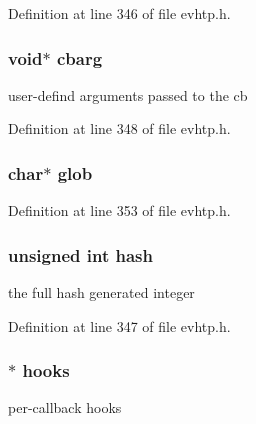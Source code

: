 Definition at line 346 of file evhtp.\-h.

\hypertarget{structevhtp__callback__s_aafd3d1a6343925cb274875556a6faa0e}{
\subsubsection[{cbarg}]{\setlength{\rightskip}{0pt plus 5cm}void$\ast$ cbarg}}\label{structevhtp__callback__s_aafd3d1a6343925cb274875556a6faa0e}
user-\/defind arguments passed to the cb 

Definition at line 348 of file evhtp.\-h.

\hypertarget{structevhtp__callback__s_ac921642f435071137acef3e073973b99}{
\subsubsection[{glob}]{\setlength{\rightskip}{0pt plus 5cm}char$\ast$ glob}}\label{structevhtp__callback__s_ac921642f435071137acef3e073973b99}


Definition at line 353 of file evhtp.\-h.

\hypertarget{structevhtp__callback__s_a09f9a9ce240560b1d191b42ed56af642}{
\subsubsection[{hash}]{\setlength{\rightskip}{0pt plus 5cm}unsigned int hash}}\label{structevhtp__callback__s_a09f9a9ce240560b1d191b42ed56af642}
the full hash generated integer 

Definition at line 347 of file evhtp.\-h.

\hypertarget{structevhtp__callback__s_ac97663394f74c9030e57c771cfb7981e}{
\subsubsection[{hooks}]{$\ast$ hooks}}\label{structevhtp__callback__s_ac97663394f74c9030e57c771cfb7981e}
per-\/callback hooks 


